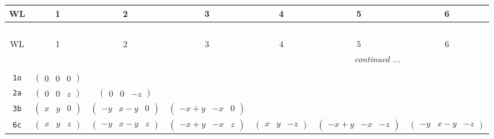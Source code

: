 \documentclass[fleqn,9pt,landscape]{jsarticle}
\begin{document}
\begin{center}
\renewcommand{\arraystretch}{1.2}
\begin{longtable}{ccccccc}
 \hline \hline
WL & 1 & 2 & 3 & 4 & 5 & 6 \\ \hline \endfirsthead

\multicolumn{6}{l}{\tablename\ \thetable{}} \\
 \hline \hline
WL & 1 & 2 & 3 & 4 & 5 & 6 \\ \hline \endhead

 \hline \hline
\multicolumn{6}{r}{\footnotesize\it continued ...} \\ \endfoot

 \hline \hline
\multicolumn{6}{r}{} \\ \endlastfoot

{\tt 1o} & $ \begin{pmatrix} 0 & 0 & 0 \end{pmatrix} $ & $  $ & $  $ & $  $ & $  $ & $  $ \\ \hline
{\tt 2a} & $ \begin{pmatrix} 0 & 0 & z \end{pmatrix} $ & $ \begin{pmatrix} 0 & 0 & - z \end{pmatrix} $ & $  $ & $  $ & $  $ & $  $ \\ \hline
{\tt 3b} & $ \begin{pmatrix} x & y & 0 \end{pmatrix} $ & $ \begin{pmatrix} - y & x - y & 0 \end{pmatrix} $ & $ \begin{pmatrix} - x + y & - x & 0 \end{pmatrix} $ & $  $ & $  $ & $  $ \\ \hline
{\tt 6c} & $ \begin{pmatrix} x & y & z \end{pmatrix} $ & $ \begin{pmatrix} - y & x - y & z \end{pmatrix} $ & $ \begin{pmatrix} - x + y & - x & z \end{pmatrix} $ & $ \begin{pmatrix} x & y & - z \end{pmatrix} $ & $ \begin{pmatrix} - x + y & - x & - z \end{pmatrix} $ & $ \begin{pmatrix} - y & x - y & - z \end{pmatrix} $ \\
\end{longtable}
\end{center}
\end{document}
